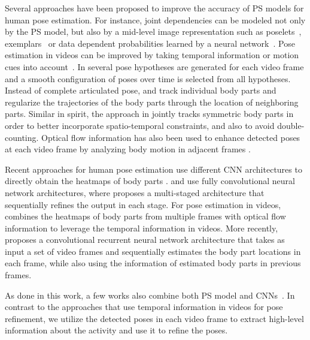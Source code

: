 \documentclass[a4paper, 10pt, conference]{ieeeconf}      \usepackage{FG2017}
\begin{document}
Several approaches have been proposed to improve the accuracy of PS models for human pose estimation. For instance, joint dependencies can be modeled not only by the PS model, but also by a mid-level image representation such as poselets~\cite{
pishchulin_cvpr2013}, exemplars~\cite{sap_cvpr2010} or data dependent probabilities learned by a neural network~\cite{chen_nips2014}.  
Pose estimation in videos can be improved by taking temporal information or motion cues into account~\cite{park_iccv2011, cherian_cvpr2014, zuffi_iccv2013, georgia2016eccv, newell2016stacked, insafutdinov16ariv}. In \cite{park_iccv2011} several pose hypotheses are generated for each video frame and a smooth configuration of poses over time is selected from all hypotheses. Instead of complete articulated pose, \cite{ramakrishna_cvpr2013} and \cite{cherian_cvpr2014} track individual body parts and regularize the trajectories of the body parts through the location of neighboring parts. Similar in spirit, the approach in \cite{dong2015iccv} jointly tracks symmetric body parts in order to better incorporate spatio-temporal constraints, and also to avoid double-counting. Optical flow information has also been used to enhance detected poses at each video frame by analyzing body motion in adjacent frames \cite{fragkiadaki2013pose, zuffi_iccv2013}. 

Recent approaches for human pose estimation use different CNN architectures to directly obtain the heatmaps of body parts \cite{tompson_cvpr2015, Pfister15a, wei2016cvpr, Pishchulin_2016_CVPR, rafi2016bmvc, georgia2016eccv}.  \cite{tompson_cvpr2015, wei2016cvpr, Pishchulin_2016_CVPR} and \cite{rafi2016bmvc} use fully convolutional neural network architectures, where \cite{wei2016cvpr} proposes a multi-staged architecture that sequentially refines the output in each stage. For pose estimation in videos, \cite{Pfister15a} combines the heatmaps of body parts from multiple frames with optical flow information to leverage the temporal information in videos. More recently, \cite{georgia2016eccv} proposes a convolutional recurrent neural network architecture that takes as input a set of video frames and sequentially estimates the body part locations in each frame, while also using the information of estimated body parts in previous frames. 

As done in this work, a few works also combine both PS model and CNNs~\cite{chen_nips2014, tompson2014joint}. In contrast to the approaches that use temporal information in videos for pose refinement, we utilize the detected poses in each video frame to extract high-level information about the activity and use it to refine the poses. 
\end{document}
